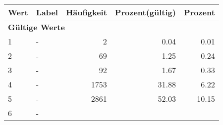      \begin{longtable}{lXrrr}
     \toprule
     \textbf{Wert} & \textbf{Label} & \textbf{Häufigkeit} & \textbf{Prozent(gültig)} & \textbf{Prozent} \\
     \endhead
     \midrule
     \multicolumn{5}{l}{\textbf{Gültige Werte}}\\

     1 &
     \multicolumn{1}{X}{ -  } &


       \num{2} &
       \num[round-mode=places,round-precision=2]{0,04} &
         \num[round-mode=places,round-precision=2]{0,01} \\

     2 &
     \multicolumn{1}{X}{ -  } &


       \num{69} &
       \num[round-mode=places,round-precision=2]{1,25} &
         \num[round-mode=places,round-precision=2]{0,24} \\

     3 &
     \multicolumn{1}{X}{ -  } &


       \num{92} &
       \num[round-mode=places,round-precision=2]{1,67} &
         \num[round-mode=places,round-precision=2]{0,33} \\

     4 &
     \multicolumn{1}{X}{ -  } &


       \num{1753} &
       \num[round-mode=places,round-precision=2]{31,88} &
         \num[round-mode=places,round-precision=2]{6,22} \\

     5 &
     \multicolumn{1}{X}{ -  } &


       \num{2861} &
       \num[round-mode=places,round-precision=2]{52,03} &
         \num[round-mode=places,round-precision=2]{10,15} \\

     6 &
     \multicolumn{1}{X}{ -  } &



\end{longtable}
